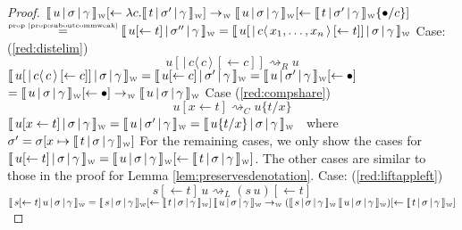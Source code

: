 \documentclass[a4paper,UKenglish,cleveref, autoref]{lipics-v2019}
\newcommand{\abs}[2]{\lambda #1 . #2}
\newcommand{\app}[2]{#1 \, #2}
\newcommand{\share}[3]{#1 [#2 \leftarrow #3]}
\newcommand{\dist}[5]{#1 [ #2 \, \vert \, \fakedist{#4}{#5} \, #3 ]}
\newcommand{\fakedist}[2]{#1 \langle \, #2 \, \rangle}
\newcommand{\sub}[3]{#1 \{ #2 / #3 \}}
\newcommand{\weaksymbol}{\mbox{\tiny $\mathcal{W}$}}
\newcommand{\readweakwmap}[3]{\llbracket \, #1 \, \vert \, #2 \, \vert \, #3  \, \rrbracket_{\weaksymbol} }
\newcommand{\byprop}[1]{\stackrel{\hbox{\tiny #1}}{\hbox{=}}}
\begin{document}
\begin{proof}
\newline
\indent $\readweakwmap{u}{\sigma}{\gamma} \share{}{}{\abs{c}{\readweakwmap{t}{\sigma'}{\gamma}}} \rightarrow_{\weaksymbol} \readweakwmap{u}{\sigma}{\gamma} \share{}{}{\readweakwmap{t}{\sigma'}{\gamma} \sub{}{\bullet}{c}}$
\newline
\indent $\byprop{prop \ref{prop:suboutcommweak}} \readweakwmap{u \share{}{}{t}}{\sigma''}{\gamma} = \readweakwmap{ \dist{u}{}{\share{}{}{t}}{c}{x_{1}, \dots, x_{n}}}{\sigma}{\gamma}$
\newline
\newline
Case: (\ref{red:distelim})
$$\dist{u}{}{\share{}{}{c}}{c}{c} \rightsquigarrow_{R} u$$
$\readweakwmap{\dist{u}{}{\share{}{}{c}}{c}{c}}{\sigma}{\gamma} = \readweakwmap{u \share{}{}{c}}{\sigma'}{\gamma} = \readweakwmap{u}{\sigma'}{\gamma} \share{}{}{\bullet}$
\newline
$= \readweakwmap{u}{\sigma}{\gamma} \share{}{}{\bullet} \rightarrow_{\weaksymbol} \readweakwmap{u}{\sigma}{\gamma}$
\newline
\newline
Case (\ref{red:compshare})
$$\share{u}{x}{t} \rightsquigarrow_{C} \sub{u}{t}{x}$$
$\readweakwmap{\share{u}{x}{t}}{\sigma}{\gamma} = \readweakwmap{u}{\sigma'}{\gamma} = \readweakwmap{\sub{u}{t}{x}}{\sigma}{\gamma} $\
\newline
where
\newline
$\sigma' = \sigma [x \mapsto \readweakwmap{t}{\sigma}{\gamma}]$
\newline
\newline
\newline
For the remaining cases, we only show the cases for  $\readweakwmap{u \share{}{}{t}}{\sigma}{\gamma} = \share{\readweakwmap{u}{\sigma}{\gamma}}{}{\readweakwmap{t}{\sigma}{\gamma}}$. The other cases are similar to those in the proof for Lemma \ref{lem:preservesdenotation}.
\newline
\newline
Case: (\ref{red:liftappleft})
$$\app{s \share{}{}{t}}{u} \rightsquigarrow_{L} (\app{s}{u}) \share{}{}{t}  $$
$\readweakwmap{\app{s \share{}{}{t}}{u}}{\sigma}{\gamma} = \app{\readweakwmap{s}{\sigma}{\gamma} \share{}{}{\readweakwmap{t}{\sigma}{\gamma}}}{\readweakwmap{u}{\sigma}{\gamma}} \rightarrow_{\weaksymbol} (\app{\readweakwmap{s}{\sigma}{\gamma}}{\readweakwmap{u}{\sigma}{\gamma}})  \share{}{}{\readweakwmap{t}{\sigma}{\gamma}} $ 
\newline

\end{proof}
\end{document}
